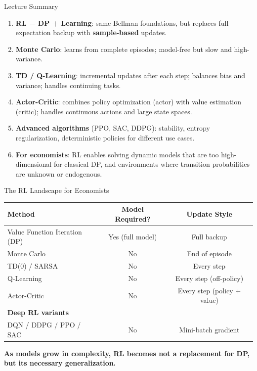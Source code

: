 \documentclass[10pt,english,aspectratio=169]{beamer}
\begin{document}
\begin{frame}{Lecture Summary}
\begin{enumerate}
    \item \textbf{RL = DP + Learning}: same Bellman foundations, but replaces full expectation backup with \textbf{sample-based} updates.

    \item \textbf{Monte Carlo}: learns from complete episodes; model-free but slow and high-variance.

    \item \textbf{TD / Q-Learning}: incremental updates after each step; balances bias and variance; handles continuing tasks.

    \item \textbf{Actor-Critic}: combines policy optimization (actor) with value estimation (critic); handles continuous actions and large state spaces.

    \item \textbf{Advanced algorithms} (PPO, SAC, DDPG): stability, entropy regularization, deterministic policies for different use cases.

    \item \textbf{For economists}: RL enables solving dynamic models that are too high-dimensional for classical DP, and environments where transition probabilities are unknown or endogenous.
\end{enumerate}
\end{frame}


\begin{frame}{The RL Landscape for Economists}
\centering
\begin{tabular}{lcc}
\toprule
\textbf{Method} & \textbf{Model Required?} & \textbf{Update Style} \\
\midrule
Value Function Iteration (DP) & Yes (full model) & Full backup \\
Monte Carlo & No & End of episode \\
TD(0) / SARSA & No & Every step \\
Q-Learning & No & Every step (off-policy) \\
Actor-Critic & No & Every step (policy + value) \\
\midrule
\textbf{Deep RL variants} & & \\
DQN / DDPG / PPO / SAC & No & Mini-batch gradient \\
\bottomrule
\end{tabular}

\vspace{0.5cm}
\textbf{As models grow in complexity, RL becomes not a replacement for DP, but its necessary \textbf{generalization}.}
\end{frame}
\end{document}
